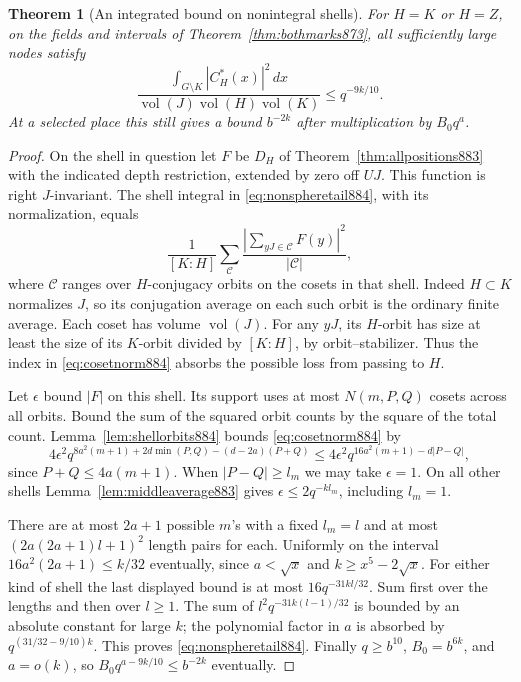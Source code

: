 \documentclass[a4paper,11pt]{article}
\newtheorem{theorem}[proposition]{Theorem}
\theoremstyle{definition}
\theoremstyle{remark}
\numberwithin{equation}{section}
\begin{document}
\begin{theorem}[An integrated bound on nonintegral shells]
\leavevmode\label{thm:nonspheretail884}
For \(H=K\) or \(H=Z\), on the fields and intervals of
Theorem~\ref{thm:bothmarks873}, all sufficiently large nodes satisfy
\begin{equation}
 \frac{\int_{G\setminus K}|C_H^{*}(x)|^2\,dx}
 {\operatorname{vol}(J)\operatorname{vol}(H)\operatorname{vol}(K)}
                 \le q^{-9k/10}.
 \label{eq:nonspheretail884}
\end{equation}
At a selected place this still gives a bound \(b^{-2k}\) after
multiplication by \(B_0q^a\).
\end{theorem}
\begin{proof}
On the shell in question let \(F\) be \(D_H\) of
Theorem~\ref{thm:allpositions883} with the indicated depth
restriction, extended by zero off \(UJ\). This function is
right \(J\)-invariant. The shell integral in
\eqref{eq:nonspheretail884}, with its normalization, equals
\begin{equation}
  \frac1{[K:H]}\sum_{\mathcal C}
       \frac{\left|\sum_{yJ\in\mathcal C}F(y)\right|^2}{|\mathcal C|},
 \label{eq:cosetnorm884}
\end{equation}
where \(\mathcal C\) ranges over \(H\)-conjugacy orbits on the
cosets in that shell. Indeed \(H\subset K\) normalizes \(J\),
so its conjugation average on each such orbit is the ordinary
finite average. Each coset has volume \(\operatorname{vol}(J)\).
For any \(yJ\), its \(H\)-orbit has size at least the size of its
\(K\)-orbit divided by \([K:H]\), by orbit--stabilizer. Thus the
index in \eqref{eq:cosetnorm884} absorbs the possible loss from
passing to \(H\).

Let \(\epsilon\) bound \(|F|\) on this shell. Its support uses at
most \(N(m,P,Q)\) cosets across all orbits. Bound the sum of the
squared orbit counts by the square of the total count.
Lemma~\ref{lem:shellorbits884} bounds \eqref{eq:cosetnorm884} by
\[
 4\epsilon^2 q^{8a^2(m+1)+2d\min(P,Q)-(d-2a)(P+Q)}
       \le 4\epsilon^2 q^{16a^2(m+1)-d|P-Q|},
\]
since \(P+Q\le4a(m+1)\). When \(|P-Q|\ge l_m\) we may take
\(\epsilon=1\). On all other shells Lemma~\ref{lem:middleaverage883}
gives \(\epsilon\le2q^{-k l_m}\), including \(l_m=1\).

There are at most \(2a+1\) possible \(m\)'s with a fixed \(l_m=l\)
and at most \((2a(2a+1)l+1)^2\) length pairs for each.
Uniformly on the interval \(16a^2(2a+1)\le k/32\) eventually,
since \(a<\sqrt{x}\) and \(k\ge x^5-2\sqrt x\).
For either kind of shell the last displayed bound is at most
\(16q^{-31kl/32}\). Sum first over the lengths and then over
\(l\ge1\). The sum of \(l^2 q^{-31k(l-1)/32}\) is bounded by
an absolute constant for large \(k\); the polynomial factor in
\(a\) is absorbed by \(q^{(31/32-9/10)k}\). This proves
\eqref{eq:nonspheretail884}. Finally \(q\ge b^{10}\),
\(B_0=b^{6k}\), and \(a=o(k)\), so
\(B_0q^{a-9k/10}\le b^{-2k}\) eventually.
\end{proof}
\end{document}
